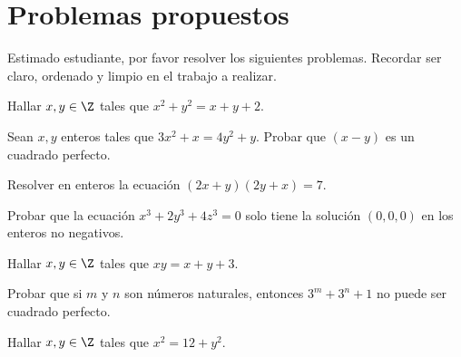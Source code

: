 \section{Problemas propuestos}

Estimado estudiante, por favor resolver los siguientes problemas.
Recordar ser claro, ordenado y limpio en el trabajo a realizar.

\begin{problem}
    Hallar $x,y \in \Z$ tales que $x^2 + y^2 = x + y + 2$.
\end{problem}

\begin{problem}
    Sean $x,y$ enteros tales que $3x^2 + x = 4y^2 + y$.
    Probar que $(x - y)$ es un cuadrado perfecto.
\end{problem}

\begin{problem}
    Resolver en enteros la ecuación $(2x + y)(2y + x) = 7$.
\end{problem}

\begin{problem}
    Probar que la ecuación $x^3 + 2y^3 + 4z^3 = 0$ solo tiene la solución $(0, 0, 0)$ en los enteros no negativos.
\end{problem}

\begin{problem}
    Hallar $x,y \in \Z$ tales que $xy = x + y + 3$.
\end{problem}

\begin{problem}
    Probar que si $m$ y $n$ son números naturales, entonces $3^m + 3^n + 1$ no puede ser cuadrado perfecto.
\end{problem}

\begin{problem}
    Hallar $x,y \in \Z$ tales que $x^2 = 12 + y^2$.
\end{problem}